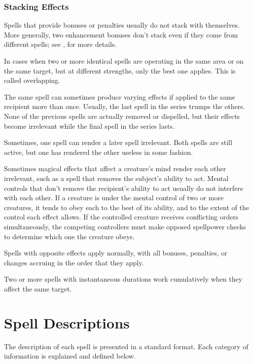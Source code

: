\subsubsection{Stacking Effects}
Spells that provide bonuses or penalties usually do not stack with themselves. More generally, two enhancement bonuses don't stack even if they come from different spells; see , for more details.

 In cases when two or more identical spells are operating in the same area or on the same target, but at different strengths, only the best one applies. This is called overlapping.

 The same spell can sometimes produce varying effects if applied to the same recipient more than once. Usually, the last spell in the series trumps the others. None of the previous spells are actually removed or dispelled, but their effects become irrelevant while the final spell in the series lasts.

 Sometimes, one spell can render a later spell irrelevant. Both spells are still active, but one has rendered the other useless in some fashion.

 Sometimes magical effects that affect a creature's mind render each other irrelevant, such as a spell that removes the subject's ability to act. Mental controls that don't remove the recipient's ability to act usually do not interfere with each other. If a creature is under the mental control of two or more creatures, it tends to obey each to the best of its ability, and to the extent of the control each effect allows. If the controlled creature receives conflicting orders simultaneously, the competing controllers must make opposed spellpower checks to determine which one the creature obeys.

 Spells with opposite effects apply normally, with all bonuses, penalties, or changes accruing in the order that they apply.

 Two or more spells with instantaneous durations work cumulatively when they affect the same target.

\section{Spell Descriptions}
The description of each spell is presented in a standard format. Each category of information is explained and defined below.


